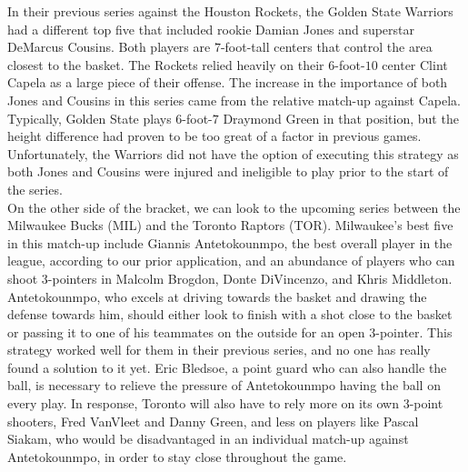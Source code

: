 \documentclass[12pt]{article}%
\begin{document}
\null\quad\quad In their previous series against the Houston Rockets, the Golden State Warriors had a different top five that included rookie Damian Jones and superstar DeMarcus Cousins. Both players are $7$-foot-tall centers that control the area closest to the basket. The Rockets relied heavily on their $6$-foot-$10$ center Clint Capela as a large piece of their offense. The increase in the importance of both Jones and Cousins in this series came from the relative match-up against Capela. Typically, Golden State plays $6$-foot-$7$ Draymond Green in that position, but the height difference had proven to be too great of a factor in previous games. Unfortunately, the Warriors did not have the option of executing this strategy as both Jones and Cousins were injured and ineligible to play prior to the start of the series.\\
\null\quad\quad On the other side of the bracket, we can look to the upcoming series between the Milwaukee Bucks (MIL) and the Toronto Raptors (TOR). Milwaukee's best five in this match-up include Giannis Antetokounmpo, the best overall player in the league, according to our prior application, and an abundance of players who can shoot $3$-pointers in Malcolm Brogdon, Donte DiVincenzo, and Khris Middleton. Antetokounmpo, who excels at driving towards the basket and drawing the defense towards him, should either look to finish with a shot close to the basket or passing it to one of his teammates on the outside for an open $3$-pointer. This strategy worked well for them in their previous series, and no one has really found a solution to it yet. Eric Bledsoe, a point guard who can also handle the ball, is necessary to relieve the pressure of Antetokounmpo having the ball on every play. In response, Toronto will also have to rely more on its own 3-point shooters, Fred VanVleet and Danny Green, and less on players like Pascal Siakam, who would be disadvantaged in an individual match-up against Antetokounmpo, in order to stay close throughout the game. 
\end{document}
